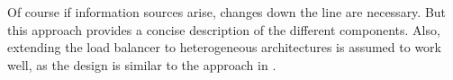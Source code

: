 Of course if information sources arise, changes down the line are necessary.
But this approach provides a concise description of the different components.
Also, extending the load balancer to heterogeneous architectures is assumed to
work well, as the design is similar to the approach in
\cite{sarma_smartbalance_2015}.


\begin{comment}

\paragraph{Topology description}
Represents the cache and core layout of the CPU.
On Haswell it consist of a package description containing core descriptions.
A core description consists of the hardware assigned APIC\_id, the kernel
assigned fiasco\_id, and the SMT abstraction.
It can be expanded to include multi-socket systems by adding more package
descriptions.
It maps the fiasco view on the cores onto the actual HW topology and uses CPUID
to determine corresponding logical cores.

\paragraph{Thread\_t}
is the administrative representation of a L4-thread.
It contains not only of the thread parameters passed via run\_thread(), but
also measurements for the current and last interval.
LLC-misses, execution time, an identifier, and the cores it currently runs on
and will run on in the next interval.

\end{comment}
